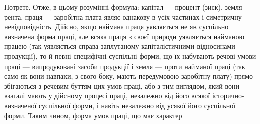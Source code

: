 Потрете. Отже, в цьому розумінні формула: капітал — процент (зиск), земля
— рента, праця — заробітна плата являє однакову в усіх частинах і симетричну
невідповідність. Дійсно, якщо наймана праця уявляється не як суспільно
визначена форма праці, але всяка праця з своєї природи уявляється найманою
працею (так уявляється справа заплутаному капіталістичними відносинами
продукції), то й певні специфічні суспільні форми, що їх набувають речові умови
праці — випродуковані засоби продукції і земля — проти найманої праці
(так само як вони навпаки, з свого боку, мають передумовою заробітну
плату) прямо збігаються з речевим буттям цих умов праці, або з тим
виглядом, який вони взагалі мають у дійсному процесі праці, незалежно
від його всякої історично-визначеної суспільної форми, і навіть незалежно від
усякої його суспільної форми. Таким чином, форма умов праці, що має характер
